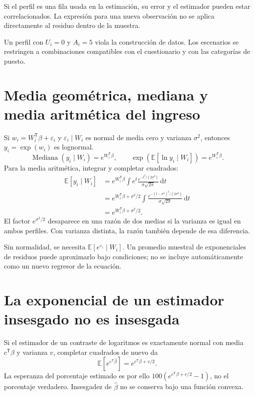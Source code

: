 \documentclass[11pt,a4paper]{article}
\newcommand{\E}{\mathbb E}
\begin{document}
Si el perfil es una fila usada en la estimación, su error y el estimador pueden estar correlacionados. La expresión para una nueva observación no se aplica directamente al residuo dentro de la muestra.

Un perfil con $U_i=0$ y $A_i=5$ viola la construcción de datos. Los escenarios se restringen a combinaciones compatibles con el cuestionario y con las categorías de puesto.

\clearpage
\section{Media geométrica, mediana y media aritmética del ingreso}

Si $w_i=W_i^{\mathsf T}\beta+\varepsilon_i$ y $\varepsilon_i\mid W_i$ es normal de media cero y varianza $\sigma^2$, entonces $y_i=\exp(w_i)$ es lognormal.
\[
\operatorname{Mediana}(y_i\mid W_i)=e^{W_i^{\mathsf T}\beta},
\qquad
\exp(\E[\ln y_i\mid W_i])=e^{W_i^{\mathsf T}\beta}.
\]
Para la media aritmética, integrar y completar cuadrados:
\[
\begin{aligned}
\E[y_i\mid W_i]
&=e^{W_i^{\mathsf T}\beta}\int e^t
\frac{e^{-t^2/(2\sigma^2)}}{\sigma\sqrt{2\pi}}\,\mathrm dt\\
&=e^{W_i^{\mathsf T}\beta+\sigma^2/2}
\int\frac{e^{-(t-\sigma^2)^2/(2\sigma^2)}}{\sigma\sqrt{2\pi}}\,\mathrm dt\\
&=e^{W_i^{\mathsf T}\beta+\sigma^2/2}.
\end{aligned}
\]
El factor $e^{\sigma^2/2}$ desaparece en una razón de dos medias si la varianza es igual en ambos perfiles. Con varianza distinta, la razón también depende de esa diferencia.

Sin normalidad, se necesita $\E[e^{\varepsilon_i}\mid W_i]$. Un promedio muestral de exponenciales de residuos puede aproximarlo bajo condiciones; no se incluye automáticamente como un nuevo regresor de la ecuación.

\clearpage
\section{La exponencial de un estimador insesgado no es insesgada}

Si el estimador de un contraste de logaritmos es exactamente normal con media $c^{\mathsf T}\beta$ y varianza $v$, completar cuadrados de nuevo da
\[
\E[e^{c^{\mathsf T}\widehat\beta}]
=e^{c^{\mathsf T}\beta+v/2}.
\]
La esperanza del porcentaje estimado es por ello
$100(e^{c^{\mathsf T}\beta+v/2}-1)$, no el porcentaje verdadero. Insesgadez de $\widehat\beta$ no se conserva bajo una función convexa.
\end{document}
